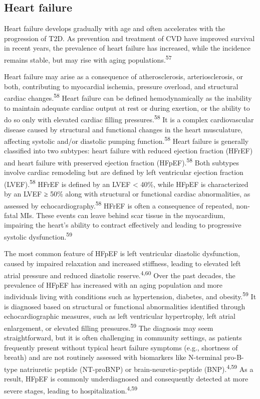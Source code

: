 \documentclass[
  a4paper,
  headsepline=true,
  open=left]{scrbook}
\begin{document}
\hypertarget{heart-failure}{%
\subsection{Heart failure}\label{heart-failure}}

Heart failure develops gradually with age and often accelerates with the
progression of T2D. As prevention and treatment of CVD have improved
survival in recent years, the prevalence of heart failure has increased,
while the incidence remains stable, but may rise with aging
populations.\textsuperscript{57}

Heart failure may arise as a consequence of atherosclerosis,
arteriosclerosis, or both, contributing to myocardial ischemia, pressure
overload, and structural cardiac changes.\textsuperscript{58} Heart
failure can be defined hemodynamically as the inability to maintain
adequate cardiac output at rest or during exertion, or the ability to do
so only with elevated cardiac filling pressures.\textsuperscript{58} It
is a complex cardiovascular disease caused by structural and functional
changes in the heart musculature, affecting systolic and/or diastolic
pumping function.\textsuperscript{58} Heart failure is generally
classified into two subtypes: heart failure with reduced ejection
fraction (HFrEF) and heart failure with preserved ejection fraction
(HFpEF).\textsuperscript{58} Both subtypes involve cardiac remodeling
but are defined by left ventricular ejection fraction
(LVEF).\textsuperscript{58} HFrEF is defined by an LVEF \textless{}
40\%, while HFpEF is characterized by an LVEF ≥ 50\% along with
structural or functional cardiac abnormalities, as assessed by
echocardiography.\textsuperscript{58} HFrEF is often a consequence of
repeated, non-fatal MIs. These events can leave behind scar tissue in
the myocardium, impairing the heart's ability to contract effectively
and leading to progressive systolic dysfunction.\textsuperscript{59}

The most common feature of HFpEF is left ventricular diastolic
dysfunction, caused by impaired relaxation and increased stiffness,
leading to elevated left atrial pressure and reduced diastolic
reserve.\textsuperscript{4,60} Over the past decades, the prevalence of
HFpEF has increased with an aging population and more individuals living
with conditions such as hypertension, diabetes, and
obesity.\textsuperscript{59} It is diagnosed based on structural or
functional abnormalities identified through echocardiographic measures,
such as left ventricular hypertrophy, left atrial enlargement, or
elevated filling pressures.\textsuperscript{59} The diagnosis may seem
straightforward, but it is often challenging in community settings, as
patients frequently present without typical heart failure symptoms
(e.g., shortness of breath) and are not routinely assessed with
biomarkers like N-terminal pro-B-type natriuretic peptide (NT-proBNP) or
brain-neuretic-peptide (BNP).\textsuperscript{4,59} As a result, HFpEF
is commonly underdiagnosed and consequently detected at more severe
stages, leading to hospitalization.\textsuperscript{4,59}
\end{document}
